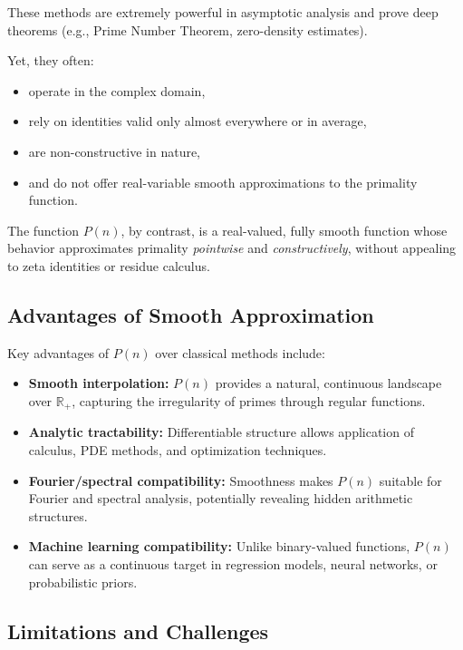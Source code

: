 \documentclass[12pt]{article}
\theoremstyle{definition}
\theoremstyle{plain}
\theoremstyle{remark}
\begin{document}
These methods are extremely powerful in asymptotic analysis and prove deep theorems (e.g., Prime Number Theorem, zero-density estimates).

Yet, they often:
\begin{itemize}
    \item operate in the complex domain,
    \item rely on identities valid only almost everywhere or in average,
    \item are non-constructive in nature,
    \item and do not offer real-variable smooth approximations to the primality function.
\end{itemize}

The function \( P(n) \), by contrast, is a real-valued, fully smooth function whose behavior approximates primality \emph{pointwise} and \emph{constructively}, without appealing to zeta identities or residue calculus.

\subsection{Advantages of Smooth Approximation}

Key advantages of \( P(n) \) over classical methods include:
\begin{itemize}
    \item \textbf{Smooth interpolation:} \( P(n) \) provides a natural, continuous landscape over \( \mathbb{R}_+ \), capturing the irregularity of primes through regular functions.
    \item \textbf{Analytic tractability:} Differentiable structure allows application of calculus, PDE methods, and optimization techniques.
    \item \textbf{Fourier/spectral compatibility:} Smoothness makes \( P(n) \) suitable for Fourier and spectral analysis, potentially revealing hidden arithmetic structures.
    \item \textbf{Machine learning compatibility:} Unlike binary-valued functions, \( P(n) \) can serve as a continuous target in regression models, neural networks, or probabilistic priors.
\end{itemize}

\subsection{Limitations and Challenges}
\end{document}
